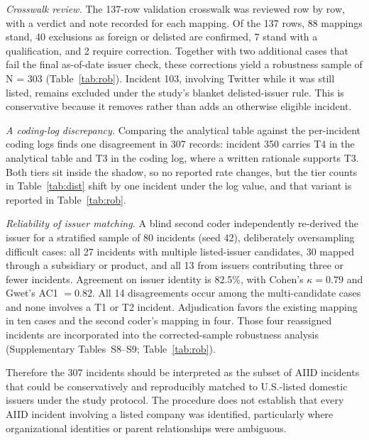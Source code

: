 \documentclass[utf8]{FrontiersinHarvard}
\begin{document}
\textit{Crosswalk review.} The 137-row validation crosswalk was reviewed row by row, with a verdict and note recorded for each mapping. Of the 137 rows, 88 mappings stand, 40 exclusions as foreign or delisted are confirmed, 7 stand with a qualification, and 2 require correction. Together with two additional cases that fail the final as-of-date issuer check, these corrections yield a robustness sample of N = 303 (Table~\ref{tab:rob}). Incident 103, involving Twitter while it was still listed, remains excluded under the study's blanket delisted-issuer rule. This is conservative because it removes rather than adds an otherwise eligible incident.

\textit{A coding-log discrepancy.} Comparing the analytical table against the per-incident coding logs finds one disagreement in 307 records: incident 350 carries T4 in the analytical table and T3 in the coding log, where a written rationale supports T3. Both tiers sit inside the shadow, so no reported rate changes, but the tier counts in Table~\ref{tab:dist} shift by one incident under the log value, and that variant is reported in Table~\ref{tab:rob}.

\textit{Reliability of issuer matching.} A blind second coder independently re-derived the issuer for a stratified sample of 80 incidents (seed 42), deliberately oversampling difficult cases: all 27 incidents with multiple listed-issuer candidates, 30 mapped through a subsidiary or product, and all 13 from issuers contributing three or fewer incidents. Agreement on issuer identity is 82.5\%, with Cohen's $\kappa = 0.79$ and Gwet's AC1 $= 0.82$. All 14 disagreements occur among the multi-candidate cases and none involves a T1 or T2 incident. Adjudication favors the existing mapping in ten cases and the second coder's mapping in four. Those four reassigned incidents are incorporated into the corrected-sample robustness analysis (Supplementary Tables~S8--S9; Table~\ref{tab:rob}).

Therefore the 307 incidents should be interpreted as the subset of AIID incidents that could be conservatively and reproducibly matched to U.S.-listed domestic issuers under the study protocol. The procedure does not establish that every AIID incident involving a listed company was identified, particularly where organizational identities or parent relationships were ambiguous.
\end{document}
